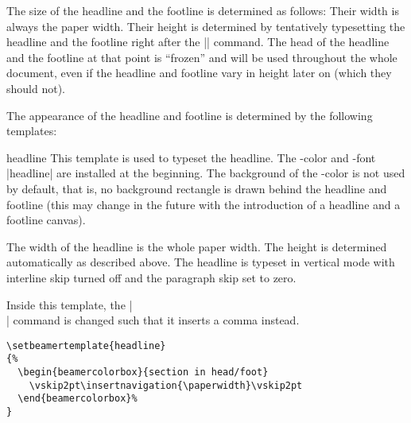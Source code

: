 The size of the headline and the footline is determined as follows: Their width is always the paper width. Their height is determined by tentatively typesetting the headline and the footline right after the || command. The head of the headline and the footline at that point is ``frozen'' and will be used throughout the whole document, even if the headline and footline vary in height later on (which they should not).

The appearance of the headline and footline is determined by the following templates:

\begin{element}{headline}\yes\yes\yes
  This template is used to typeset the headline. The \beamer-color and -font |headline| are installed at the beginning. The background of the \beamer-color is not used by default, that is, no background rectangle is drawn behind the headline and footline (this may change in the future with the introduction of a headline and a footline canvas).

  The width of the headline is the whole paper width. The height is determined automatically as described above. The headline is typeset in vertical mode with interline skip turned off and the paragraph skip set to zero.

  Inside this template, the |\\| command is changed such that it inserts a comma instead.

  \example
\begin{verbatim}
\setbeamertemplate{headline}
{%
  \begin{beamercolorbox}{section in head/foot}
    \vskip2pt\insertnavigation{\paperwidth}\vskip2pt
  \end{beamercolorbox}%
}
\end{verbatim}


\end{element}
